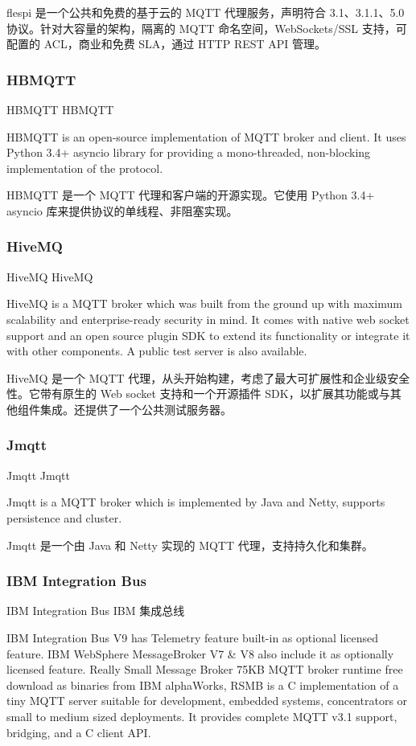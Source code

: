 \documentclass{ctexbook}
\begin{document}
flespi 是一个公共和免费的基于云的 MQTT 代理服务，声明符合 3.1、3.1.1、5.0 协议。针对大容量的架构，隔离的 MQTT 命名空间，WebSockets/SSL 支持，可配置的 ACL，商业和免费 SLA，通过 HTTP REST API 管理。

\subsubsection{HBMQTT}
HBMQTT HBMQTT

HBMQTT is an open-source implementation of MQTT broker and client. It uses Python 3.4+ asyncio library for providing a mono-threaded, non-blocking implementation of the protocol.

HBMQTT 是一个 MQTT 代理和客户端的开源实现。它使用 Python 3.4+ asyncio 库来提供协议的单线程、非阻塞实现。

\subsubsection{HiveMQ}
HiveMQ HiveMQ

HiveMQ is a MQTT broker which was built from the ground up with maximum scalability and enterprise-ready security in mind. It comes with native web socket support and an open source plugin SDK to extend its functionality or integrate it with other components. A public test server is also available.

HiveMQ 是一个 MQTT 代理，从头开始构建，考虑了最大可扩展性和企业级安全性。它带有原生的 Web socket 支持和一个开源插件 SDK，以扩展其功能或与其他组件集成。还提供了一个公共测试服务器。

\subsubsection{Jmqtt}
Jmqtt Jmqtt

Jmqtt is a MQTT broker which is implemented by Java and Netty, supports persistence and cluster.

Jmqtt 是一个由 Java 和 Netty 实现的 MQTT 代理，支持持久化和集群。

\subsubsection{IBM Integration Bus}
IBM Integration Bus IBM 集成总线

IBM Integration Bus V9 has Telemetry feature built-in as optional licensed feature. IBM WebSphere MessageBroker V7 \& V8 also include it as optionally licensed feature. Really Small Message Broker 75KB MQTT broker runtime free download as binaries from IBM alphaWorks, RSMB is a C implementation of a tiny MQTT server suitable for development, embedded systems, concentrators or small to medium sized deployments. It provides complete MQTT v3.1 support, bridging, and a C client API.
\end{document}
